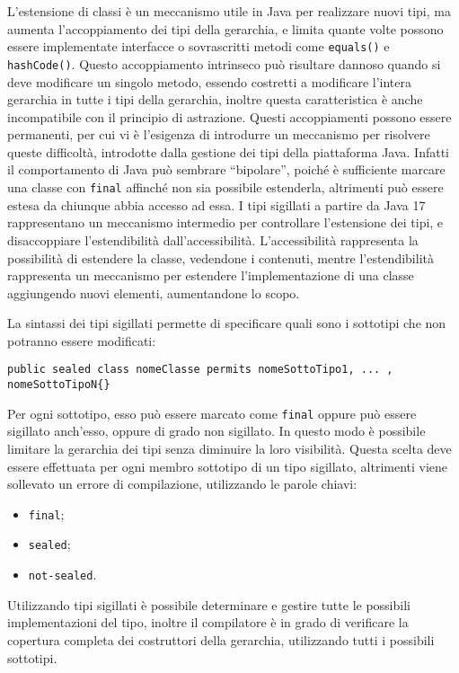 \documentclass{article}
\numberwithin{equation}{subsection}
\begin{document}
L'estensione di classi è un meccanismo utile in Java per realizzare nuovi tipi, ma aumenta l'accoppiamento dei tipi della gerarchia, e limita quante volte possono essere implementate interfacce o 
sovrascritti metodi come \verb|equals()| e \verb|hashCode()|. Questo accoppiamento intrinseco può risultare dannoso quando si deve modificare un singolo metodo, essendo costretti a modificare l'intera gerarchia in tutte i 
tipi della gerarchia, inoltre questa caratteristica è anche incompatibile con il principio di astrazione. 
Questi accoppiamenti possono essere permanenti, per cui vi è l'esigenza di introdurre un meccanismo per risolvere queste difficoltà, introdotte dalla gestione dei tipi della piattaforma Java. 
Infatti il comportamento di Java può sembrare ``bipolare'', poiché è sufficiente marcare una classe con \verb|final| affinché non sia possibile estenderla, altrimenti può essere estesa da chiunque abbia accesso ad 
essa. 
I tipi sigillati a partire da Java 17 rappresentano un meccanismo intermedio per controllare l'estensione dei tipi, e disaccoppiare l'estendibilità dall'accessibilità. 
L'accessibilità rappresenta la possibilità di estendere la classe, vedendone i contenuti, mentre l'estendibilità rappresenta un meccanismo per estendere l'implementazione di 
una classe aggiungendo nuovi elementi, aumentandone lo scopo. 

La sintassi dei tipi sigillati permette di specificare quali sono i sottotipi che non potranno essere modificati:
\begin{verbatim}
public sealed class nomeClasse permits nomeSottoTipo1, ... , nomeSottoTipoN{}
\end{verbatim}
Per ogni sottotipo, esso può essere marcato come \verb|final| oppure può essere sigillato anch'esso, oppure di grado non sigillato. In questo modo è possibile limitare la gerarchia dei tipi senza diminuire la loro 
visibilità. Questa scelta deve essere effettuata per ogni membro sottotipo di un tipo sigillato, altrimenti viene sollevato un errore di compilazione, utilizzando le parole chiavi:
\begin{itemize}
    \item \verb|final|;
    \item \verb|sealed|;
    \item \verb|not-sealed|.
\end{itemize}

Utilizzando tipi sigillati è possibile determinare e gestire tutte le possibili implementazioni del tipo, inoltre il compilatore è in grado di verificare la copertura completa dei costruttori della gerarchia, 
utilizzando tutti i possibili sottotipi. 
\end{document}
